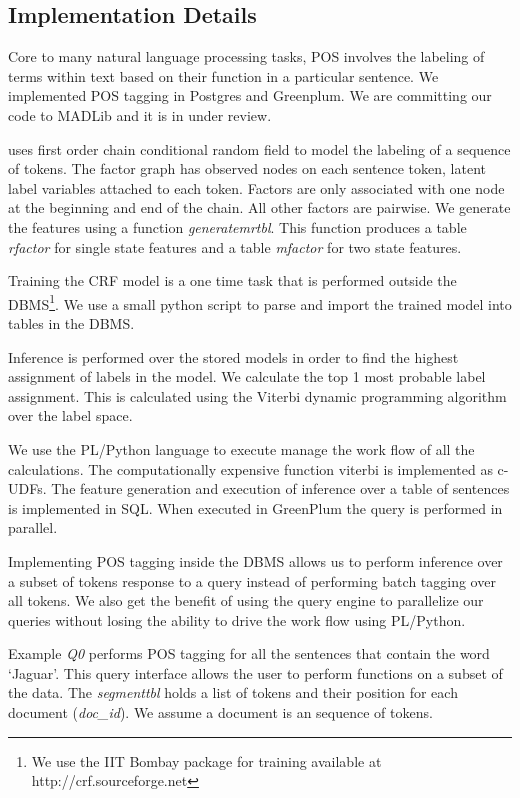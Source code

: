 \subsection{Implementation Details}
\label{sec:impdis}


Core to many natural language processing tasks, POS involves the
labeling of terms within text based on their function in a particular sentence.
We implemented POS tagging in Postgres and Greenplum. We are
committing our code to MADLib and it is in under review.

\system uses first order chain conditional random field to model the labeling
of a sequence of tokens. The factor graph has observed nodes on each sentence
token, latent label variables attached to each token.
Factors are only associated with one node at the beginning and end of the chain.
All other factors are pairwise.  
We generate the features using a function \textit{generatemrtbl}. 
This function produces a table \textit{rfactor} for single state features and a 
table \textit{mfactor} for two state features.

Training the CRF model is a one time task that is performed outside the 
DBMS\footnote{We use the IIT Bombay package for training available at 
http://crf.sourceforge.net }.
We use a small python script to parse and import the trained model into 
tables in the DBMS. 

Inference is performed over the stored models in order to find the highest 
assignment of labels in the model.
We calculate the top 1 most probable label assignment. This is calculated using
the Viterbi dynamic programming algorithm over the label space.


We use the PL/Python language to execute manage the work flow of all the 
calculations.
The computationally expensive function viterbi is implemented as c-UDFs.
The feature generation and execution of inference 
over a table of sentences is implemented in {SQL}. When executed in GreenPlum 
the query is performed in parallel.


Implementing POS tagging inside the DBMS allows us to perform inference over a 
subset of tokens response to a query instead of performing batch tagging over 
all tokens.
We also get the benefit of using the query engine to parallelize our queries
without losing the ability to drive the work flow using PL/Python.


Example \textit{Q0} performs POS tagging for  all the sentences that contain
the word `Jaguar'. This query interface allows the user to perform
functions on a subset of the data.
The \textit{segmenttbl} holds a list of tokens and their position for each
document (\textit{doc\_id}). We assume a document is an sequence of tokens.


